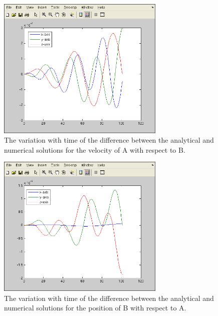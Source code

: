 \begin{description}
 \begin{figure}[!ht]
  \begin{center}
        \includegraphics[width=80mm]{figures/relative6_vab.png}
        \caption{The variation with time of the difference between the analytical and numerical solutions for the velocity of A with respect to B.} 
  \end{center}
\end{figure}

 \begin{figure}[!ht]
  \begin{center}
        \includegraphics[width=80mm]{figures/relative6_xba.png}
        \caption{The variation with time of the difference between the analytical and numerical solutions for the position of B with respect to A.} 
  \end{center}
\end{figure}


\end{description}
